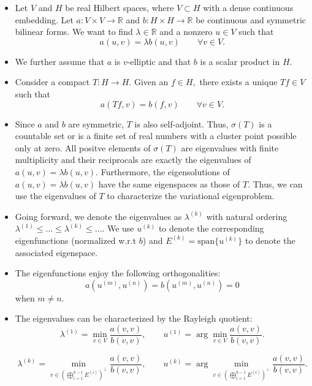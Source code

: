 \documentclass[12pt,a4paper]{article}
\theoremstyle{boldthm}
\theoremstyle{bolddefn}
\begin{document}
\begin{itemize}
    \item Let $V$ and $H$ be real Hilbert spaces, where $V \subset H$ with a dense continuous embedding. Let $a: V \times V \rightarrow \mathbb{R}$ and $b:H\times H \rightarrow \mathbb{R}$ be continuous and symmetric bilinear forms. We want to find $\lambda \in \mathbb{R}$ and a nonzero $u\in V$ such that 
    $$a(u, v) = \lambda b(u, v)\qquad \forall v \in V.$$
    \item We further assume that $a$ is $v$-elliptic and that $b$ is a scalar product in $H.$

    \item Consider a compact $T:H\rightarrow H.$ Given an $f \in H,$ there exists a unique $Tf \in V$ such that 
    $$a(Tf, v) = b(f, v) \qquad \forall v \in V.$$

    \item Since $a$ and $b$ are symmetric, $T$ is also self-adjoint. Thus, $\sigma(T)$ is a countable set  or is a finite set of real numbers with a cluster point possible only at zero. All positve elements of $\sigma(T)$ are eigenvalues with finite multiplicity and their reciprocals are exactly the eigenvalues of $a(u, v) = \lambda b(u, v).$ Furthermore, the eigensolutions of $a(u,v)=\lambda b(u,v)$ have the same eigenspaces as those of $T.$ Thus, we can use the eigenvalues of $T$ to characterize the variational eigenproblem.

    \item Going forward, we denote the eigenvalues as $\lambda^{(k)}$ with natural ordering $\lambda^{(1)} \le \dots \le \lambda^{(k)} \le \dots.$ We use $u^{(k)}$ to denote the corresponding eigenfunctions (normalized w.r.t $b$) and $E^{(k)} = \text{span}\{u^{(k)}\}$ to denote the associated eigenspace. 

    \item The eigenfunctions enjoy the following orthogonalities:
    $$a(u^{(m)}, u^{(n)}) = b(u^{(m)}, u^{(n)}) = 0$$
    when $m\ne n.$

    \item The eigenvalues can be characterized by the Rayleigh quotient:
    $$
\lambda^{(1)}
=
\min_{v\in V}
\frac{a(v,v)}{b(v,v)},
\qquad
u^{(1)}
=
\arg\min_{v\in V}
\frac{a(v,v)}{b(v,v)}.
$$

$$
\lambda^{(k)}
=
\min_{v\in \left(\bigoplus_{i=1}^{k-1} E^{(i)}\right)^\perp}
\frac{a(v,v)}{b(v,v)},
\qquad
u^{(k)}
=
\arg\min_{v\in \left(\bigoplus_{i=1}^{k-1} E^{(i)}\right)^\perp}
\frac{a(v,v)}{b(v,v)}.
$$
\end{itemize}
\end{document}
